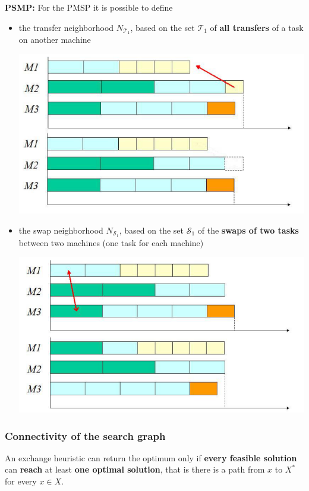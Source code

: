 \textbf{PSMP:} For the PMSP it is possible to define
\begin{itemize}
	\item the transfer neighborhood $N_{\mathcal{T}_1}$, based on the set $\mathcal{T}_1$ of \textbf{all transfers} of a task on another machine
	\begin{center}
		\includegraphics[width=0.7\columnwidth]{img/PSMP1}
	\end{center}
	\nn
	
	\item the swap neighborhood $N_{\mathcal{S}_1}$, based on the set $\mathcal{S}_1$ of the \textbf{swaps of two tasks} between two machines (one task for each machine)
	\begin{center}
		\includegraphics[width=0.7\columnwidth]{img/PSMP2}
	\end{center}
	\nn
\end{itemize}

\newpage

\subsubsection{Connectivity of the search graph}

An exchange heuristic can return the optimum only if \textbf{every feasible solution} can \textbf{reach} at least \textbf{one optimal solution}, that is there is a path from $x$ to $X^\ast$ for every $x \in X$.\\


